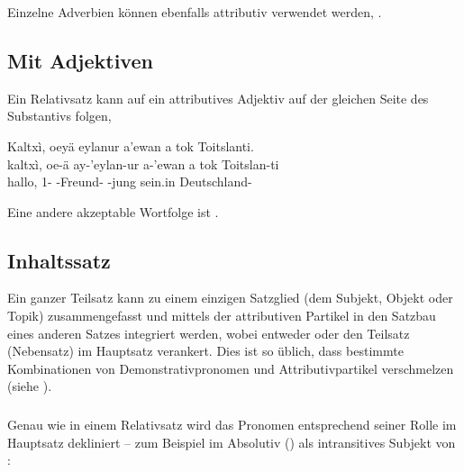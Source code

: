 \subsubsection{} Einzelne Adverbien können ebenfalls attributiv verwendet werden,  .

\subsection{Mit Adjektiven} 
Ein Relativsatz kann auf ein attributives Adjektiv auf der gleichen Seite des Substantivs folgen,

\begin{interlin}
	\glll Kaltxì, oeyä eylanur a'ewan a tok Toitslanti. \\
	kaltxì, oe-ä ay-'eylan-ur a-'ewan a tok Toitslan-ti \\
	hallo, 1- -Freund- -jung  sein.in Deutschland-\\
	 \Ipawl{}
\end{interlin}

\noindent Eine andere akzeptable Wortfolge ist .

\subsection{Inhaltssatz} Ein ganzer Teilsatz kann zu einem einzigen Satzglied (dem Subjekt, Objekt oder Topik) zusammengefasst und mittels der attributiven Partikel  in den Satzbau eines anderen Satzes integriert werden, wobei entweder  oder  den Teilsatz (Nebensatz) im Hauptsatz verankert. Dies ist so üblich, dass bestimmte Kombinationen von Demonstrativpronomen und Attributivpartikel verschmelzen (siehe ). \label{syn:clause-nom}

\subsubsection{} Genau wie in einem Relativsatz wird das Pronomen entsprechend seiner Rolle im Hauptsatz dekliniert -- zum Beispiel im Absolutiv () als intransitives Subjekt von :


